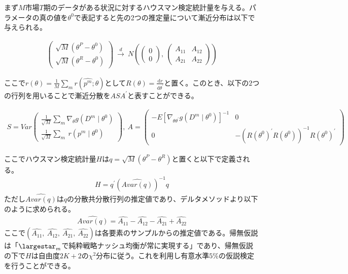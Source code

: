 \documentclass{jsarticle}
\begin{document}
まず$M$市場$T$期のデータがある状況に対するハウスマン検定統計量を与える。パラメータの真の値を$\theta^0$で表記すると先の2つの推定量について漸近分布は以下で与えられる。

\begin{align*}
	\begin{pmatrix}
	\sqrt{M}(\theta^P - \theta^0)\\[8pt]
	\sqrt{M}(\theta^R - \theta^0)
	\end{pmatrix}\ \xrightarrow{d}\ 
	N\left( \begin{pmatrix}0\\[8pt]0
	\end{pmatrix},\ 
	\begin{pmatrix}
	A_{11} & A_{12}\\[8pt]
	A_{21} & A_{22}
	\end{pmatrix}
	\right)
\end{align*}

ここで$r(\theta) = \frac{1}{M} \sum_m r(\hat{p^m} ; \theta)$として$R(\theta) = \frac{\mathrm{d}r}{\mathrm{d} \theta^{'}}$と置く。このとき、以下の$2$つの行列を用いることで漸近分散を$A S A^{'}$と表すことができる。

\begin{align*}
	S = Var\begin{pmatrix}
	\frac{1}{\sqrt{M}} \sum_m \nabla_{\theta} g(D^m \mid \theta^0)\\[8pt]
	\frac{1}{\sqrt{M}} \sum_m\ r(p^m \mid \theta^0)
	\end{pmatrix},\ 
	A = \begin{pmatrix}
	-E\left[ \nabla_{\theta \theta^{'}}g(D^m \mid \theta^0) \right]^{-1} & 0\\[8pt]
	0 & -\left( R(\theta^0)^{'} R(\theta^0) \right)^{-1} R(\theta^0)^{'}
	\end{pmatrix}
\end{align*}

ここでハウスマン検定統計量$H$は$q = \sqrt{M} (\theta^P - \theta^R)$と置くと以下で定義される。
\begin{align*}
H = q^{'} \left( \hat{Avar\left( q \right)} \right)^{-1} q
\end{align*}
ただし$\hat{Avar\left( q \right)}$は$q$の分散共分散行列の推定値であり、デルタメソッドより以下のように求められる。
\begin{align*}
	\hat{Avar\left( q \right)} = \hat{A_{11}} - \hat{A_{12}} - \hat{A_{21}} + \hat{A_{22}} 
\end{align*}
ここで$\left(\hat{A_{11}},\ \hat{A_{12}},\ \hat{A_{21}},\ \hat{A_{22}} \right)$は各要素のサンプルからの推定値である。帰無仮説は「$\largestar_m$で純粋戦略ナッシュ均衡が常に実現する」であり、帰無仮説の下で$H$は自由度$2K + 2$の$\chi^2$分布に従う。これを利用し有意水準$5\%$の仮説検定を行うことができる。
\end{document}
